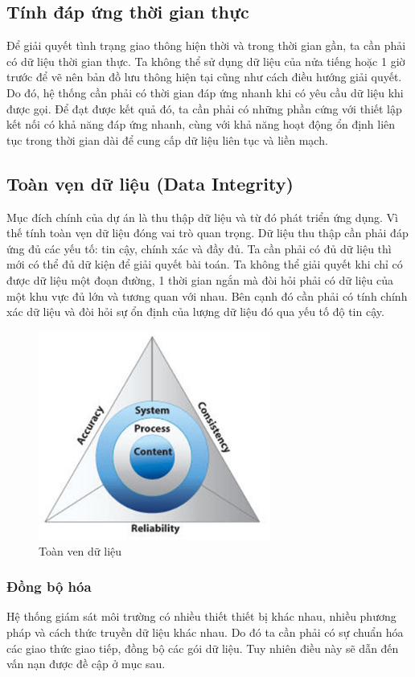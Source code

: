 \subsection*{Tính đáp ứng thời gian thực}Để giải quyết tình trạng giao thông hiện thời và trong thời gian gần, ta cần phải có dữ liệu thời gian thực. Ta không thể sử dụng dữ liệu của nửa tiếng hoặc 1 giờ trước để vẽ nên bản đồ lưu thông hiện tại cũng như cách điều hướng giải quyết. Do đó, hệ thống cần phải có thời gian đáp ứng nhanh khi có yêu cầu dữ liệu khi được gọi. Để đạt được kết quả đó, ta cần phải có những phần cứng với thiết lập kết nối có khả năng đáp ứng nhanh, cùng với khả năng hoạt động ổn định liên tục trong thời gian dài để cung cấp dữ liệu liên tục và liền mạch.


\subsection*{Toàn vẹn dữ liệu (Data Integrity)} Mục đích chính của dự án là thu thập dữ liệu và từ đó phát triển ứng dụng. Vì thế tính toàn vẹn dữ liệu đóng vai trò quan trọng. Dữ liệu thu thập cần phải đáp ứng đủ các yếu tố: tin cậy, chính xác và đầy đủ. Ta cần phải có đủ dữ liệu thì mới có thể đủ dữ kiện để giải quyết bài toán. Ta không thể giải quyết khi chỉ có được dữ liệu một đoạn đường, 1 thời gian ngắn mà đòi hỏi phải có dữ liệu của một khu vực đủ lớn và tương quan với nhau. Bên cạnh đó cần phải có tính chính xác dữ liệu và đòi hỏi sự ổn định của lượng dữ liệu đó qua yếu tố độ tin cậy. 

\begin{figure}[H]
\centering    
\includegraphics[width=3in]{toanvendulieu}
\caption[Toàn ven dữ liệu]{Toàn ven dữ liệu}
\label{fig:toanvendulieu}
\end{figure}
\subsubsection*{Đồng bộ hóa} Hệ thống giám sát môi trường có nhiều thiết thiết bị khác nhau, nhiều phương pháp và cách thức truyền dữ liệu khác nhau. Do đó ta cần phải có sự chuẩn hóa các giao thức giao tiếp, đồng bộ các gói dữ liệu. Tuy nhiên điều này sẽ dẫn đến vấn nạn được đề cập ở mục sau.

